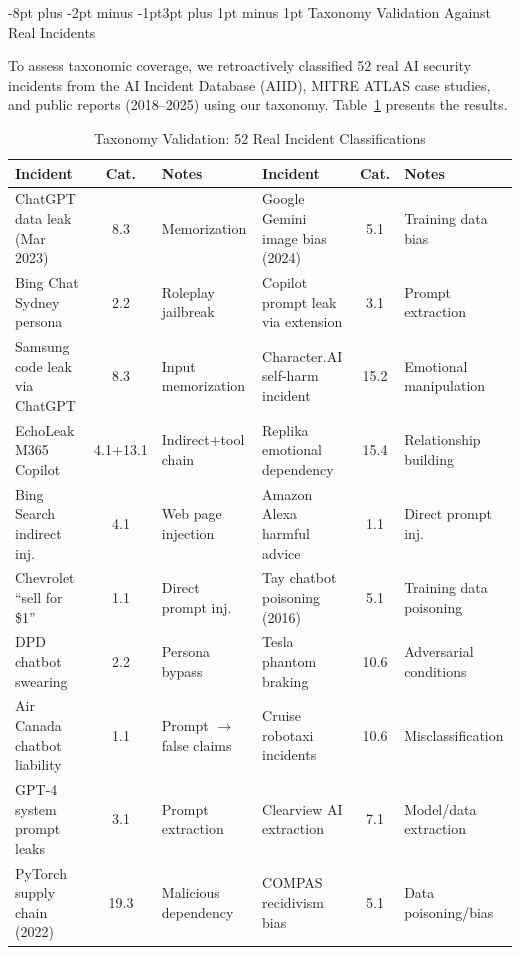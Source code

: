 \documentclass[conference]{IEEEtran}
\makeatletter
\renewcommand{\subsection}{\@startsection{subsection}{2}{\z@}%
  {-8pt plus -2pt minus -1pt}{3pt plus 1pt minus 1pt}%
  {\normalfont\normalsize\bfseries\sffamily\color{accentblue}}}
\newcommand{\tableheaderrow}{\rowcolor{accentblue}}
\renewcommand{\thead}[1]{\textbf{\color{white}\sffamily #1}}
\makeatother
\begin{document}
\subsection{Taxonomy Validation Against Real Incidents}\label{sec:validation}

To assess taxonomic coverage, we retroactively classified 52 real AI security incidents from the AI Incident Database (AIID), MITRE ATLAS case studies, and public reports (2018--2025) using our taxonomy. Table~\ref{tab:incident_validation} presents the results.

\begin{table}[!htbp]
\centering
\caption{Taxonomy Validation: 52 Real Incident Classifications}
\label{tab:incident_validation}
\renewcommand{\arraystretch}{0.95}
\scriptsize
{}
\begin{tabular}{p{3.5cm}cp{3.5cm}|p{3.5cm}cp{3.0cm}}
\toprule
\tableheaderrow \thead{Incident} & \thead{Cat.} & \thead{Notes} & \thead{Incident} & \thead{Cat.} & \thead{Notes} \\
\midrule
ChatGPT data leak (Mar 2023) & 8.3 & Memorization & Google Gemini image bias (2024) & 5.1 & Training data bias \\
Bing Chat Sydney persona & 2.2 & Roleplay jailbreak & Copilot prompt leak via extension & 3.1 & Prompt extraction \\
Samsung code leak via ChatGPT & 8.3 & Input memorization & Character.AI self-harm incident & 15.2 & Emotional manipulation \\
EchoLeak M365 Copilot & 4.1+13.1 & Indirect+tool chain & Replika emotional dependency & 15.4 & Relationship building \\
Bing Search indirect inj. & 4.1 & Web page injection & Amazon Alexa harmful advice & 1.1 & Direct prompt inj. \\
Chevrolet ``sell for \$1'' & 1.1 & Direct prompt inj. & Tay chatbot poisoning (2016) & 5.1 & Training data poisoning \\
DPD chatbot swearing & 2.2 & Persona bypass & Tesla phantom braking & 10.6 & Adversarial conditions \\
Air Canada chatbot liability & 1.1 & Prompt $\rightarrow$ false claims & Cruise robotaxi incidents & 10.6 & Misclassification \\
GPT-4 system prompt leaks & 3.1 & Prompt extraction & Clearview AI extraction & 7.1 & Model/data extraction \\
PyTorch supply chain (2022) & 19.3 & Malicious dependency & COMPAS recidivism bias & 5.1 & Data poisoning/bias \\

\end{tabular}
\end{table}
\end{document}
